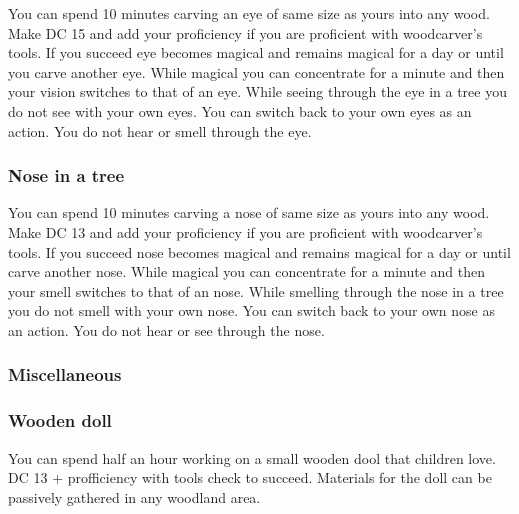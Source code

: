 You can spend 10 minutes carving an eye of same size as yours into any wood. Make DC 15 \arcana and add your proficiency if you are proficient with woodcarver's tools. If you succeed eye becomes magical and remains magical for a day or until you carve another eye. While magical you can concentrate for a minute and then your vision switches to that of an eye. While seeing through the eye in a tree you do not see with your own eyes. You can switch back to your own eyes as an action. You do not hear or smell through the eye.

\subsubsection{Nose in a tree}

You can spend 10 minutes carving a nose of same size as yours into any wood. Make DC 13 \arcana and add your proficiency if you are proficient with woodcarver's tools. If you succeed nose becomes magical and remains magical for a day or until carve another nose. While magical you can concentrate for a minute and then your smell switches to that of an nose. While smelling through the nose in a tree you do not smell with your own nose. You can switch back to your own nose as an action. You do not hear or see through the nose.

\subsubsection{Miscellaneous}

\subsubsection{Wooden doll}

You can spend half an hour working on a small wooden dool that children love. DC 13 \sleightofhands + profficiency with tools check to succeed. Materials for the doll can be passively gathered in any woodland area.
